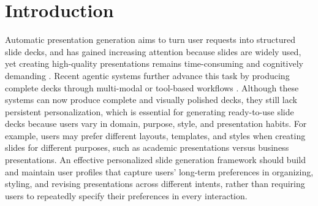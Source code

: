 \section{Introduction}

Automatic presentation generation aims to turn 
user requests into structured slide decks, and 
has gained increasing attention because slides are widely used, yet creating high-quality presentations remains time-consuming and cognitively demanding
\citep{sun2021d2s,maheshwari2024presentations,mondal2024personaaware,zeng2025slidetailor}.
Recent agentic systems further advance this task by 
producing 
complete decks through multi-modal or tool-based workflows
\citep{ge2025autopresent,zheng2025pptagent,xu2025pregenie,xie2025slidebot,liang2025slidegen,zheng2026deeppresenter,ozden2026arcdeck}.
Although these systems can now produce complete and visually polished decks,
they still lack persistent personalization, which is essential for generating ready-to-use slide decks because users vary in domain, purpose, style, and presentation habits.
For example, users may prefer different layouts, templates, and styles when creating slides for different purposes, such as academic presentations versus business presentations.
An effective personalized slide generation framework should build and maintain user profiles that capture users' long-term preferences in organizing, styling, and revising presentations across different intents, rather than requiring users to repeatedly specify their preferences in every interaction.





